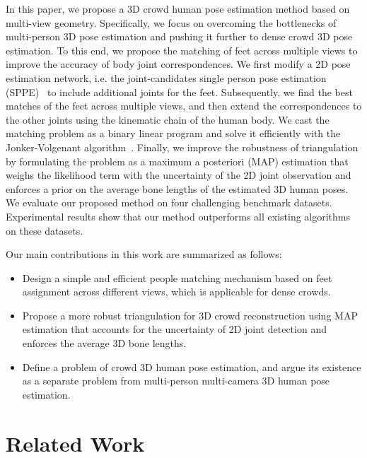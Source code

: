 \documentclass[runningheads]{llncs}
\begin{document}
In this paper, we propose a 3D crowd human pose estimation method based on multi-view geometry. Specifically, we focus on overcoming the bottlenecks of multi-person 3D pose estimation and pushing it further to dense crowd 3D pose estimation. To this end, we propose the matching of feet across multiple views to improve the accuracy of body joint correspondences. We first modify a 2D pose estimation network, i.e. the joint-candidates single person pose estimation (SPPE)~\cite{li2019crowdpose} to include additional joints for the feet. Subsequently, we find the best matches of the feet across multiple views, and then extend the correspondences to the other joints using the kinematic chain of the human body. We cast the matching problem as a binary linear program and solve it efficiently with the Jonker-Volgenant algorithm~\cite{jonker1987shortest}. Finally, we improve the robustness of triangulation by formulating the problem as a maximum a posteriori (MAP) estimation that weighs the likelihood term with the uncertainty of the 2D joint observation and enforces a prior on the average bone lengths of the estimated 3D human poses. We evaluate our proposed method on four challenging benchmark datasets. Experimental results show that our method outperforms all existing algorithms on these datasets.


Our main contributions in this work are summarized as follows:
\begin{itemize}
\item Design a simple and efficient people matching mechanism based on feet assignment across different views, which is applicable for dense crowds.\vspace{1mm}
\item Propose a more robust triangulation for 3D crowd reconstruction using MAP estimation that accounts for the uncertainty of 2D joint detection and enforces the average 3D bone lengths. 
\vspace{1mm}
\item Define a problem of crowd 3D human pose estimation, and argue its existence as a separate problem from multi-person multi-camera 3D human pose estimation. 
\end{itemize}





\section{Related Work}
\end{document}
